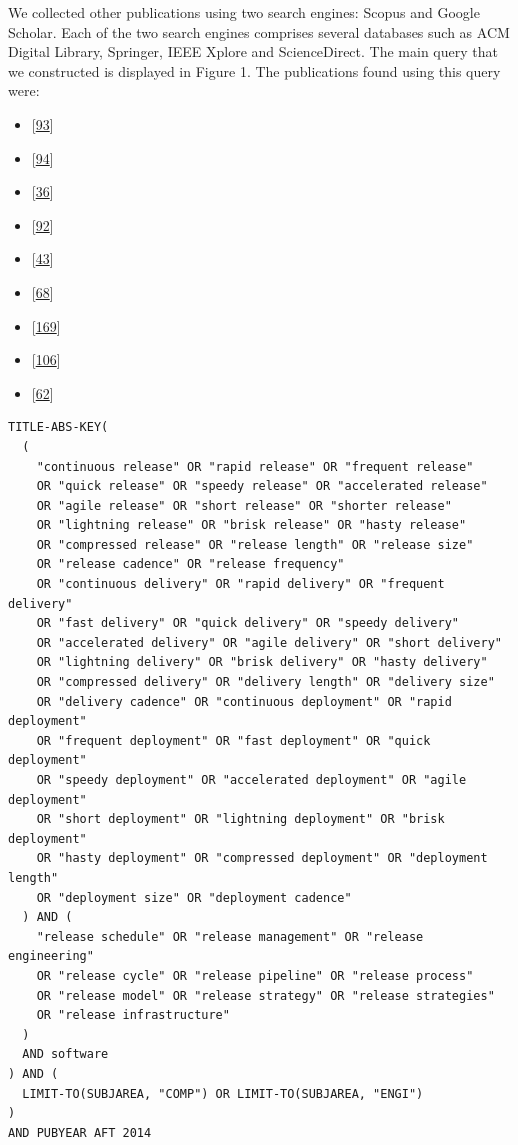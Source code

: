\documentclass[]{book}
\providecommand{\tightlist}{%
  \setlength{\itemsep}{0pt}\setlength{\parskip}{0pt}}
\begin{document}
We collected other publications using two search engines: Scopus and
Google Scholar. Each of the two search engines comprises several
databases such as ACM Digital Library, Springer, IEEE Xplore and
ScienceDirect. The main query that we constructed is displayed in Figure
1. The publications found using this query were:

\begin{itemize}
\tightlist
\item
  {[}\protect\hyperlink{ref-kaur2019a}{93}{]}
\item
  {[}\protect\hyperlink{ref-kerzazi2013a}{94}{]}
\item
  {[}\protect\hyperlink{ref-castelluccio2017a}{36}{]}
\item
  {[}\protect\hyperlink{ref-karvonen2017a}{92}{]}
\item
  {[}\protect\hyperlink{ref-claes2017a}{43}{]}
\item
  {[}\protect\hyperlink{ref-fujibayashi2017a}{68}{]}
\item
  {[}\protect\hyperlink{ref-souza2015a}{169}{]}
\item
  {[}\protect\hyperlink{ref-laukkanen2018a}{106}{]}
\item
  {[}\protect\hyperlink{ref-dyck2015a}{62}{]}
\end{itemize}

\begin{verbatim}
TITLE-ABS-KEY(
  (
    "continuous release" OR "rapid release" OR "frequent release"
    OR "quick release" OR "speedy release" OR "accelerated release"
    OR "agile release" OR "short release" OR "shorter release"
    OR "lightning release" OR "brisk release" OR "hasty release"
    OR "compressed release" OR "release length" OR "release size"
    OR "release cadence" OR "release frequency"
    OR "continuous delivery" OR "rapid delivery" OR "frequent delivery"
    OR "fast delivery" OR "quick delivery" OR "speedy delivery"
    OR "accelerated delivery" OR "agile delivery" OR "short delivery"
    OR "lightning delivery" OR "brisk delivery" OR "hasty delivery"
    OR "compressed delivery" OR "delivery length" OR "delivery size"
    OR "delivery cadence" OR "continuous deployment" OR "rapid deployment"
    OR "frequent deployment" OR "fast deployment" OR "quick deployment"
    OR "speedy deployment" OR "accelerated deployment" OR "agile deployment"
    OR "short deployment" OR "lightning deployment" OR "brisk deployment"
    OR "hasty deployment" OR "compressed deployment" OR "deployment length"
    OR "deployment size" OR "deployment cadence"
  ) AND (
    "release schedule" OR "release management" OR "release engineering"
    OR "release cycle" OR "release pipeline" OR "release process"
    OR "release model" OR "release strategy" OR "release strategies"
    OR "release infrastructure"
  )
  AND software
) AND (
  LIMIT-TO(SUBJAREA, "COMP") OR LIMIT-TO(SUBJAREA, "ENGI")
)
AND PUBYEAR AFT 2014
\end{verbatim}
\end{document}
